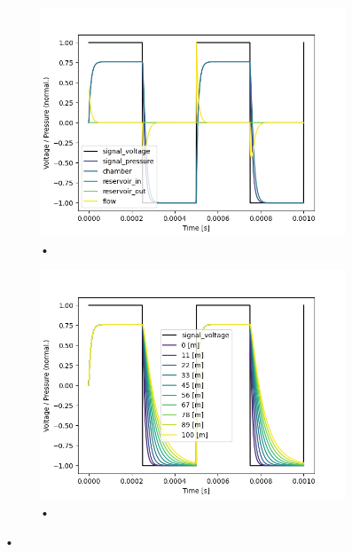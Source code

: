 \documentclass[fontsize=12pt, a4paper]{scrartcl}
\begin{document}
\begin{figure}[H]
	\centering
	\begin{subfigure}[H]{0.48\textwidth}
		\includegraphics[width=\textwidth, valign=t]{bilder/tubelength/tl_in_branch_singlesweep.png}
		\caption{•}
	\end{subfigure}
	\begin{subfigure}[H]{0.48\textwidth}
		\includegraphics[width=\textwidth, valign=t]{bilder/tubelength/tl_in_branch_multisweep.png}
		\caption{•}
	\end{subfigure}
	\caption{•}
\end{figure}
\end{document}
